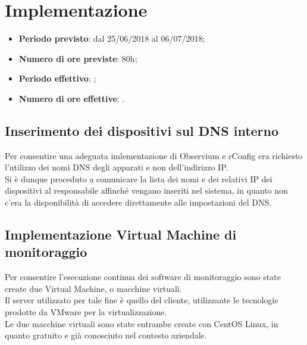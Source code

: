 \documentclass[Realizzazione.tex]{subfiles}
\begin{document}
\section{Implementazione}

\begin{itemize}
	\item \textbf{Periodo previsto}: dal 25/06/2018 al 06/07/2018;
	\item \textbf{Numero di ore previste}: 80h;
	\item \textbf{Periodo effettivo}: ;
	\item \textbf{Numero di ore effettive}: .
\end{itemize}

\subsection{Inserimento dei dispositivi sul DNS interno} 
Per consentire una adeguata imlementazione di Observium e rConfig era richiesto l'utilizzo dei nomi DNS degli apparati e non dell'indirizzo IP. \\
Si è dunque proceduto a comunicare la lista dei nomi e dei relativi IP dei dispositivi al responsabile affinché vengano inseriti nel sistema, in quanto non c'era la disponibilità di accedere direttamente alle impostazioni del DNS.

\subsection{Implementazione Virtual Machine di monitoraggio}
Per consentire l'esecuzione continua dei software di monitoraggio sono state create due Virtual Machine, o macchine virtuali.\\
Il server utilizzato per tale fine è quello del cliente, utilizzante le tecnologie prodotte da VMware per la virtualizzazione. \\
Le due macchine virtuali sono state entrambe create con CentOS Linux, in quanto gratuito e già conosciuto nel contesto aziendale.
\end{document}
